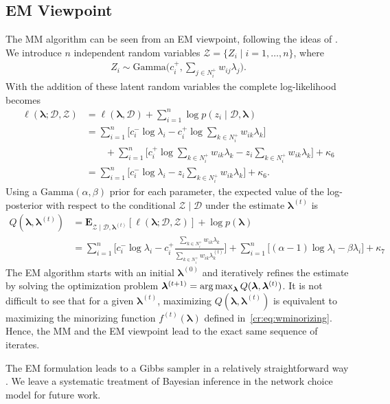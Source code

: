 \subsection{EM Viewpoint}

The MM algorithm can be seen from an EM viewpoint, following the ideas of \citet{caron2012efficient}.
We introduce $n$ independent random variables $\mathcal{Z} = \{ Z_i \mid i = 1, \ldots, n \}$, where
\begin{align*}
Z_i \sim \text{Gamma} \bigg( c^+_i, \sum_{j \in N^+_i} w_{ij} \lambda_j \bigg).
\end{align*}
With the addition of these latent random variables the complete log-likelihood becomes
\begin{align*}
\ell(\bm{\lambda} ; \mathcal{D}, \mathcal{Z})
    &= \ell(\bm{\lambda}, \mathcal{D}) + \sum_{i = 1}^n \log p(z_i \mid \mathcal{D}, \bm{\lambda}) \\
    &= \sum_{i = 1}^n \bigg[ c^-_i \log \lambda_i - c^+_i \log \sum_{k \in N^+_i} w_{ik} \lambda_k \bigg] \\
    &\qquad +\sum_{i = 1}^n \bigg[  c^+_i \log \sum_{k \in N^+_i} w_{ik} \lambda_k - z_i \sum_{k \in N^+_i} w_{ik} \lambda_k \bigg] + \kappa_6 \\
    &= \sum_{i = 1}^n \bigg[ c^-_i \log \lambda_i - z_i \sum_{k \in N^+_i} w_{ik} \lambda_k \bigg] + \kappa_6.
\end{align*}
Using a $\text{Gamma}(\alpha, \beta)$ prior for each parameter, the expected value of the log-posterior with respect to the conditional $\mathcal{Z} \mid \mathcal{D}$ under the estimate $\bm{\lambda}^{(t)}$ is
\begin{align*}
Q(\bm{\lambda}, \bm{\lambda}^{(t)})
    &= \mathbf{E}_{\mathcal{Z} \mid \mathcal{D}, \bm{\lambda}^{(t)}} \left[ \ell(\bm{\lambda} ; \mathcal{D}, \mathcal{Z}) \right]
       + \log p(\bm{\lambda}) \\
    &=\sum_{i = 1}^n \bigg[ c^-_i \log \lambda_i - c^+_i \frac{\sum_{k \in N^+_i} w_{ik} \lambda_k}{\sum_{k \in N^+_i} w_{ik} \lambda^{(t)}_k} \bigg]
      + \sum_{i = 1}^n \bigg[ (\alpha -1) \log \lambda_i - \beta \lambda_i \bigg] + \kappa_7
\end{align*}
The EM algorithm starts with an initial $\bm{\lambda}^{(0)}$ and iteratively refines the estimate by solving the optimization problem $\bm{\lambda}^{(t+1)} = \operatorname*{arg\,max}_{\bm{\lambda}} Q(\bm{\lambda}, \bm{\lambda}^{(t)})$.
It is not difficult to see that for a given $\bm{\lambda}^{(t)}$, maximizing $Q(\bm{\lambda}, \bm{\lambda}^{(t)})$ is equivalent to maximizing the minorizing function $f^{(t)}(\bm{\lambda})$ defined in~\eqref{cr:eq:wminorizing}.
Hence, the MM and the EM viewpoint lead to the exact same sequence of iterates.

The EM formulation leads to a Gibbs sampler in a relatively straightforward way \citep{caron2012efficient}.
We leave a systematic treatment of Bayesian inference in the network choice model for future work.
